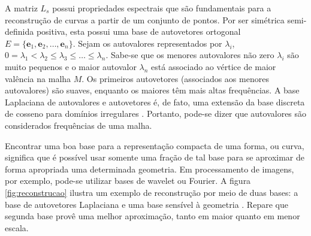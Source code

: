 \documentclass[
	12pt,				%
	oneside,			%
	a4paper,			%
	sumario=tradicional,
	english,			%
	french,				%
	spanish,			%
	brazil,				%
]{abntex2}
\begin{document}
A matriz $L_s$ possui propriedades espectrais que são fundamentais para a reconstrução de curvas a partir de um conjunto de pontos. Por ser simétrica  semi-definida positiva, esta possui uma base de autovetores ortogonal $E = \{ \mathbf{e}_1, \mathbf{e}_2, \ldots, \mathbf{e}_n \}$. Sejam os autovalores representados por $\lambda_i$, $0 = \lambda_1 < \lambda_2 \leq \lambda_3 \leq \ldots \leq \lambda_n$. Sabe-se que os menores autovalores não zero $\lambda_i$ são muito pequenos e o maior autovalor $\lambda_n$ está associado ao vértice de maior valência na malha $M$. Os primeiros autovetores (associados aos menores autovalores) são suaves, enquanto os maiores têm mais altas frequências. A base Laplaciana de autovalores e autovetores é, de fato, uma extensão da base discreta de cosseno para domínios irregulares \cite{Taubin1995}. Portanto, pode-se dizer que autovalores são considerados frequências de uma malha. 

Encontrar uma boa base para a representação compacta de uma forma, ou curva, significa que é possível usar somente uma fração de tal base para se aproximar de forma apropriada uma determinada geometria. Em processamento de imagens, por exemplo, pode-se utilizar bases de wavelet ou Fourier. A figura \ref{fig:reconstrucao} ilustra um exemplo de reconstrução por meio de duas bases: a base de autovetores Laplaciana e uma base sensível à geometria \cite{Sorkine2005}. Repare que segunda base provê uma melhor aproximação, tanto em maior quanto em menor escala.





\end{document}
